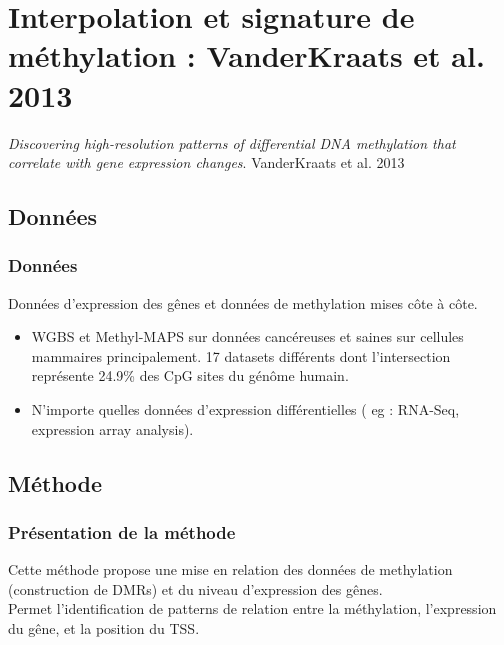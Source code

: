 \documentclass{beamer}
\begin{document}
\section{Interpolation et signature de méthylation : VanderKraats et al. 2013}
\begin{frame}
\begin{center}
\textit{Discovering high-resolution patterns of differential DNA methylation that correlate with gene expression changes}. VanderKraats et al. 2013
\end{center}
\end{frame}


\subsection{Données}
\begin{frame}
\frametitle{Données}
Données d'expression des gênes et données de methylation mises côte à côte.
\begin{itemize}
\item WGBS et Methyl-MAPS sur données cancéreuses et saines sur cellules mammaires principalement. 17 datasets différents dont l'intersection représente 24.9\% des CpG sites du génôme humain.
\item N'importe quelles données d'expression différentielles ( eg : RNA-Seq, expression array analysis).
\end{itemize}
\end{frame}

\subsection{Méthode}
\begin{frame}
\frametitle{Présentation de la méthode}
Cette méthode propose une mise en relation des données de methylation (construction de DMRs) et du niveau d'expression des gênes. \\
Permet l'identification de patterns de relation entre la méthylation, l'expression du gêne, et la position du TSS.
\end{frame}
\end{document}
